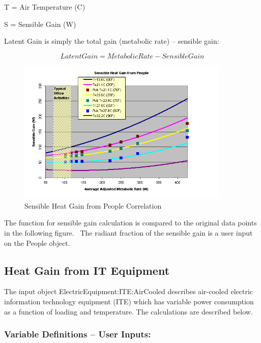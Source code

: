 T = Air Temperature (C)

S = Sensible Gain (W)

Latent Gain is simply the total gain (metabolic rate) -- sensible gain:

\begin{equation}
LatentGain = MetabolicRate - SensibleGain
\end{equation}

\begin{figure}[hbtp] %
\centering
\includegraphics[width=0.9\textwidth, height=0.9\textheight, keepaspectratio=true]{media/image5820.png}
\caption{Sensible Heat Gain from People Correlation \protect \label{fig:sensible-heat-gain-from-people-correlation}}
\end{figure}

The function for sensible gain calculation is compared to the original data points in the following figure.~ The radiant fraction of the sensible gain is a user input on the People object.

\subsection{Heat Gain from IT Equipment}\label{heat-gain-from-it-equipment}

The input object ElectricEquipment:ITE:AirCooled describes air-cooled electric information technology equipment (ITE) which has variable power consumption as a function of loading and temperature. The calculations are described below.

\subsubsection{Variable Definitions -- User Inputs:}\label{variable-definitions-user-inputs}

